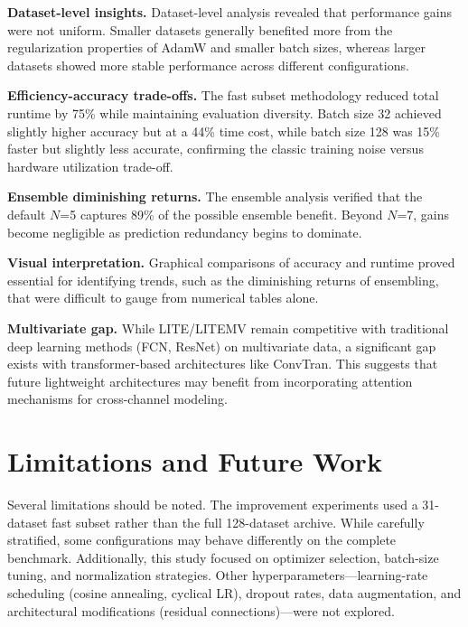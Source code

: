 \documentclass[conference]{IEEEtran}
\begin{document}
\textbf{Dataset-level insights.} Dataset-level analysis revealed that performance gains were not uniform. Smaller datasets generally benefited more from the regularization properties of AdamW and smaller batch sizes, whereas larger datasets showed more stable performance across different configurations.

\textbf{Efficiency-accuracy trade-offs.} The fast subset methodology reduced total runtime by 75\% while maintaining evaluation diversity. Batch size 32 achieved slightly higher accuracy but at a 44\% time cost, while batch size 128 was 15\% faster but slightly less accurate, confirming the classic training noise versus hardware utilization trade-off.

\textbf{Ensemble diminishing returns.} The ensemble analysis verified that the default $N$=5 captures 89\% of the possible ensemble benefit. Beyond $N$=7, gains become negligible as prediction redundancy begins to dominate.

\textbf{Visual interpretation.} Graphical comparisons of accuracy and runtime proved essential for identifying trends, such as the diminishing returns of ensembling, that were difficult to gauge from numerical tables alone.

\textbf{Multivariate gap.} While LITE/LITEMV remain competitive with traditional deep learning methods (FCN, ResNet) on multivariate data, a significant gap exists with transformer-based architectures like ConvTran. This suggests that future lightweight architectures may benefit from incorporating attention mechanisms for cross-channel modeling.

\section{Limitations and Future Work}

Several limitations should be noted. The improvement experiments used a 31-dataset fast subset rather than the full 128-dataset archive. While carefully stratified, some configurations may behave differently on the complete benchmark. Additionally, this study focused on optimizer selection, batch-size tuning, and normalization strategies. Other hyperparameters---learning-rate scheduling (cosine annealing, cyclical LR), dropout rates, data augmentation, and architectural modifications (residual connections)---were not explored.
\end{document}
